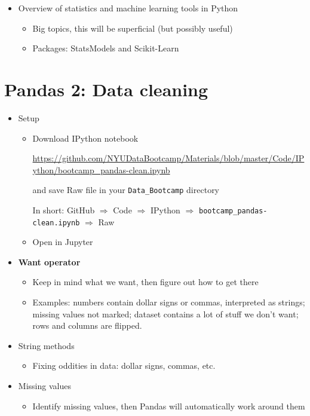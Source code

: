 \documentclass[11pt]{article}
\begin{document}
\begin{itemize}
\item Overview of statistics and machine learning tools in Python
\begin{itemize}
\item Big topics, this will be superficial (but possibly useful)
\item Packages:  StatsModels and Scikit-Learn
\end{itemize}

\end{itemize}

\section*{Pandas 2:  Data cleaning}

\begin{itemize}
\item Setup
\begin{itemize}
\item Download IPython notebook

\url{https://github.com/NYUDataBootcamp/Materials/blob/master/Code/IPython/bootcamp_pandas-clean.ipynb}

and save Raw file in your \verb|Data_Bootcamp| directory

In short:  GitHub $\Rightarrow$ Code $\Rightarrow$ IPython $\Rightarrow$
 \verb|bootcamp_pandas-clean.ipynb| $\Rightarrow$ Raw

\item Open in Jupyter
\end{itemize}

\item {\bf Want operator}
\begin{itemize}
\item Keep in mind what we want, then figure out how to get there
\item Examples:  numbers contain dollar signs or commas, interpreted as strings;
missing values not marked;
dataset contains a lot of stuff we don't want; rows and columns are flipped.
\end{itemize}

\item String methods
\begin{itemize}
\item Fixing oddities in data:  dollar signs, commas, etc.
\end{itemize}

\item Missing values
\begin{itemize}
\item Identify missing values, then Pandas will automatically work around them
\end{itemize}


\end{itemize}
\end{document}
